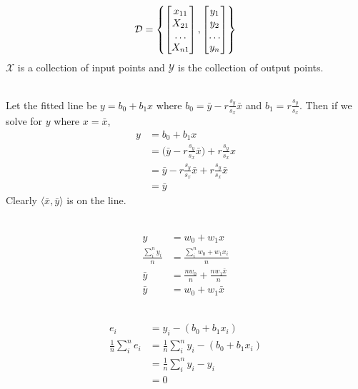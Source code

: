 \documentclass[12pt]{article}
\begin{document}
\begin{enumerate}

$$ \mathcal{D} = \left\{ \begin{bmatrix} x_{11} \\ X_{21} \\ \hdots \\ X_{n1} \end{bmatrix}, \begin{bmatrix} y_1 \\ y_2 \\ \hdots \\ y_n \end{bmatrix}\right\} $$ 
$\mathcal{X}$ is a collection of input points and $\mathcal{Y}$ is the collection of output points. 

 \\
Let the fitted line be $y = b_0 + b_1x$ where $b_0 = \bar{y} - r\frac{s_y}{s_x}\bar{x}$ and $b_1 = r\frac{s_y}{s_x}$. Then if we solve for $y$ where $x = \bar{x}$, 
$$ \begin{aligned} y &= b_0 + b_1x \\ &= \Big(\bar{y} - r\frac{s_y}{s_x}\bar{x}\Big) + r\frac{s_y}{s_x}x \\ &= \bar{y} - r\frac{s_y}{s_x}\bar{x} + r\frac{s_y}{s_x}\bar{x} \\ &= \bar{y} \end{aligned} $$ Clearly $\langle \bar{x},\bar{y} \rangle$ is on the line.  

\newpage

 \\ 
$$ \begin{aligned} y &= w_0 + w_1x \\ \frac{\sum_i^n y_i}{n} &= \frac{\sum_i^n w_0 + w_1x_i}{n} \\ \bar{y} &= \frac{nw_0}{n} + \frac{nw_1\bar{x}}{n} \\ \bar{y} &= w_0 + w_1\bar{x}
\end{aligned} $$ 

 \\
$$ \begin{aligned} e_i &= y_i - (b_0 + b_1x_i) \\ \frac{1}{n} \sum_i^n e_i &= \frac{1}{n} \sum_i^n y_i - (b_0 + b_1x_i) \\ &= \frac{1}{n} \sum_i^n y_i -  y_i \\ &= 0 \end{aligned} $$ 


\end{enumerate}
\end{document}
